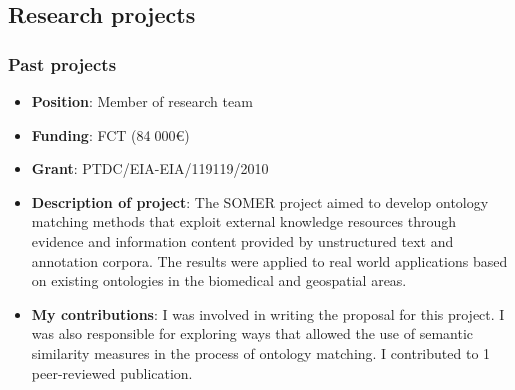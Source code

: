 \subsection{Research projects}






\subsubsection{Past projects}

\begin{itemize}
    \item \textbf{Position}: Member of research team
    \item \textbf{Funding}: FCT (84$\;$000€)
    \item \textbf{Grant}: PTDC/EIA-EIA/119119/2010
    \item \textbf{Description of project}: The SOMER project aimed to develop ontology matching methods that exploit external knowledge resources through evidence and information content provided by unstructured text and annotation corpora. The results were applied to real world applications based on existing ontologies in the biomedical and geospatial areas.
    \item \textbf{My contributions}: I was involved in writing the proposal for this project. I was also responsible for exploring ways that allowed the use of semantic similarity measures in the process of ontology matching. I contributed to 1 peer-reviewed publication.
\end{itemize}

